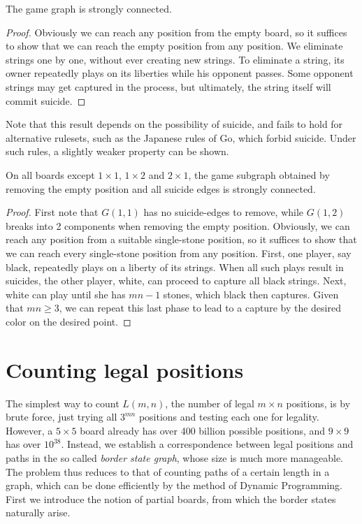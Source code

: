 \documentclass{article}
\begin{document}
\begin{lemma}
The game graph is strongly connected.
\end{lemma}

\begin{proof}
Obviously we can reach any position from the empty board, so it
suffices to show that we can reach the empty position from any position.
We eliminate strings one by one, without ever creating new strings.
To eliminate a string, its owner repeatedly plays on its liberties
while his opponent passes.
Some opponent strings may get captured in the process, but ultimately,
the string itself will commit suicide.
\end{proof}

Note that this result depends on the possibility of suicide,
and fails to hold for alternative rulesets, such as the Japanese
rules of Go, which forbid suicide. Under such rules, a slightly weaker
property can be shown.

\begin{lemma}
On all boards except $1 \times 1$, $1 \times 2$ and $2 \times 1$,
the game subgraph obtained by removing the empty position and all
suicide edges is strongly connected.
\end{lemma}

\begin{proof}
First note that $G(1,1)$ has no suicide-edges to remove,
while $G(1,2)$ breaks into 2 components when removing the empty position.
Obviously, we can reach any position from a suitable single-stone position,
so it suffices to show that we can reach every single-stone position
from any position.
First, one player, say black, repeatedly plays on a liberty of its strings.
When all such plays result in suicides, the other player, white, can proceed
to capture all black strings.
Next, white can play until she has $mn-1$ stones, which black then captures.
Given that $mn \geq 3$, we can repeat this last phase to lead to a
capture by the desired color on the desired point.
\end{proof}

\section{Counting legal positions}

The simplest way to count $L(m,n)$, the number of legal $m \times n$
positions, is by brute force, just trying
all $3^{mn}$ positions and testing each one for legality.
However, a $5 \times 5$ board already has over 400 billion possible
positions, and $9 \times 9$ has over $10^{38}$.
Instead, we establish a correspondence between legal positions and
paths in the so called {\em border state graph}, whose size is much
more manageable. The problem thus reduces to that of counting paths
of a certain length in a graph, which can be done efficiently
by the method of Dynamic Programming.
First we introduce the notion of partial boards, from which the
border states naturally arise.
\end{document}
